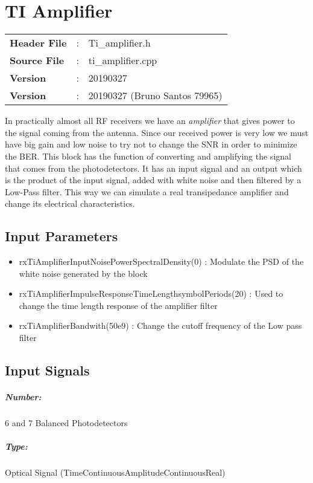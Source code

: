 \graphicspath{{./lib/ti_amplifier/figures/}}
\clearpage
\section{TI Amplifier}
\begin{tcolorbox}	
	\begin{tabular}{p{2.75cm} p{0.2cm} p{10.5cm}} 	
		\textbf{Header File}   &:& Ti\_amplifier.h \\
		\textbf{Source File}   &:& ti\_amplifier.cpp \\
		\textbf{Version}       &:& 20190327\\
		\textbf{Version}       &:& 20190327 (Bruno Santos 79965)\\
	\end{tabular}
\end{tcolorbox}
\maketitle
In practically almost all RF receivers we have an \textit{amplifier} that gives power to the signal coming from the antenna. Since our received power is very low we must have big gain and low noise to try not to change the SNR in order to minimize the BER. \newline
This block has the function of converting and amplifying the signal that comes from the photodetectors. It has an input signal and an output which is the product of the input signal, added with white noise and then filtered by a Low-Pass filter. This way we can simulate a real transipedance amplifier and change its electrical characteristics.


\subsection*{Input Parameters}

\begin{itemize}
	\item rxTiAmplifierInputNoisePowerSpectralDensity(0) :  Modulate the PSD of the white noise generated by the block
	\item rxTiAmplifierImpulseResponseTimeLengthsymbolPeriods(20) : Used to change the time length response of the amplifier filter
	\item rxTiAmplifierBandwith(50e9) : Change the cutoff frequency of the Low pass filter
\end{itemize}


\subsection*{Input Signals}
\subparagraph*{Number:} 6 and 7 Balanced Photodetectors
\subparagraph*{Type:} Optical Signal (TimeContinuousAmplitudeContinuousReal)
